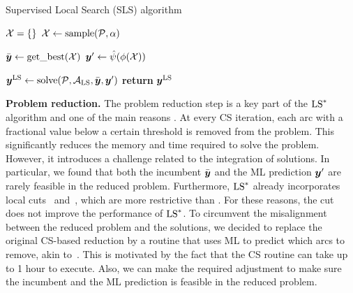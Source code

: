 \documentclass[3p, authoryear, times, doubleblind]{elsarticle}
\begin{document}
{%


\begin{algorithm}
    \caption{Supervised Local Search (SLS) algorithm}\label{alg:sls}
    \begin{algorithmic}
    \State $\mathcal{X} = \{\}$  
        \State $\mathcal{X} \gets \text{sample}(\mathcal{P}, \alpha)$ 
    \EndFor

    \State $\bar{\boldsymbol{y}} \gets \text{get\_best}(\mathcal{X})$ 
    \State $\boldsymbol{y}' \gets \hat{\psi}(\phi(\mathcal{X}))$ 

    \State $\boldsymbol{y}^{\text{LS}} \gets \text{solve}(\mathcal{P}, \mathcal{A}_{\text{LS}}, \bar{\boldsymbol{y}}, \boldsymbol{y}')$ 
    \State \textbf{return} $\boldsymbol{y}^{\text{LS}}$
    \EndProcedure
    \end{algorithmic}
\end{algorithm}

\textbf{Problem reduction. }  The problem reduction step is a key part of the $\text{LS}^*$ algorithm and one of the main reasons . At every CS iteration, each arc with a fractional value below a certain threshold is removed from the problem. This significantly reduces the memory and time required to solve the problem. However, it introduces a challenge related to the integration of  solutions. In particular, we found that both the incumbent $\bar{\boldsymbol{y}}$ and the ML prediction $\boldsymbol{y}'$ are rarely feasible in the reduced problem. Furthermore, $\text{LS}^*$ already incorporates local cuts~ and~, which are more restrictive than . For these reasons, the cut~ does not improve the performance of $\text{LS}^*$. To circumvent the misalignment between the reduced problem and the  solutions, we decided to replace the original CS-based reduction by a routine that uses ML to predict which arcs to remove, akin to~\cite{sun_generalization_2021}. This is motivated by the fact that the CS routine can take up to 1 hour to execute. Also, we can make the required adjustment to make sure the incumbent and the ML prediction is feasible in the reduced problem. 

}
\end{document}
